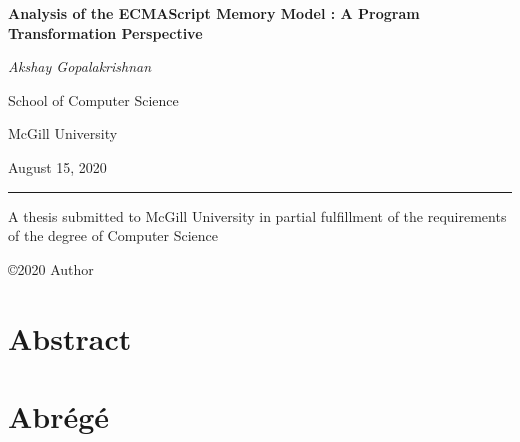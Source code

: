 \documentclass[12pt, TexShade, letterpaper]{report}
\author{\textcopyright Author, August, 2020}
\date{}
\begin{document}
\begin{titlepage}
    \begin{center}
        \vspace*{0.5cm}

        \LARGE
        \textbf{Analysis of the ECMAScript Memory Model : A Program Transformation Perspective}
        
        \vspace{1cm}
        
        \textit{Akshay Gopalakrishnan}
        
        \vspace{7cm}
        
        
        \Large
        School of Computer Science
        
        \vspace{5mm}
        McGill University
        
        \vspace{5mm}
        
        \vspace{5mm}
        August 15, 2020
        \small
        \vspace{0.5cm}
        {\color{red} \hrule height 0.75mm}
        
        \vspace{0.3cm}
        A thesis submitted to McGill University in partial fulfillment of the requirements of the degree of Computer Science
        
        \copyright\hspace{0.5mm}2020 Author
        
    \end{center}
\end{titlepage}

\setlength{\voffset}{2cm}
\renewcommand{\chaptermark}[1]{%
    \markboth{\thechapter.\ #1}{}}
    

    \chapter*{Abstract}
	\label{chap:engAbstract}
    

\chapter*{Abrégé}
	\label{chap:frAbstract}
\end{document}
